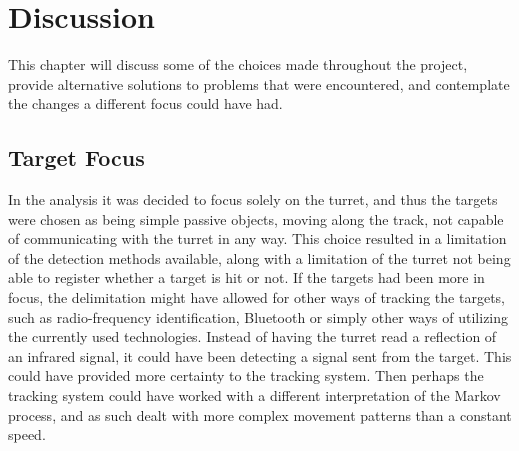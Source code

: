 \chapter{Discussion}
This chapter will discuss some of the choices made throughout the project, provide alternative solutions to problems that were encountered, and contemplate the changes a different focus could have had.

\section{Target Focus}
In the analysis it was decided to focus solely on the turret, and thus the targets were chosen as being simple passive objects, moving along the track, not capable of communicating with the turret in any way. This choice resulted in a limitation of the detection methods available, along with a limitation of the turret not being able to register whether a target is hit or not. If the targets had been more in focus, the delimitation might have allowed for other ways of tracking the targets, such as radio-frequency identification, Bluetooth or simply other ways of utilizing the currently used technologies. Instead of having the turret read a reflection of an infrared signal, it could have been detecting a signal sent from the target. This could have provided more certainty to the tracking system. Then perhaps the tracking system could have worked with a different interpretation of the Markov process, and as such dealt with more complex movement patterns than a constant speed.\\


